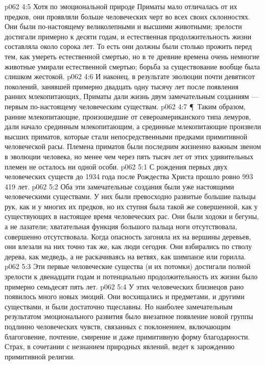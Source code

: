 \vs p062 4:5 Хотя по эмоциональной природе Приматы мало отличалась от их предков, они проявляли больше человеческих черт во всех своих склонностях. Они были по\hyp{}настоящему великолепными и высшими животными; зрелости достигали примерно к десяти годам, и естественная продолжительность жизни составляла около сорока лет. То есть они должны были столько прожить перед тем, как умереть естественной смертью, но в те древние времена очень немногие животные умирали естественной смертью; борьба за существование вообще была слишком жестокой.
\vs p062 4:6 И наконец, в результате эволюции почти девятисот поколений, занявшей примерно двадцать одну тысячу лет после появления ранних млекопитающих, Приматы  дали жизнь двум замечательным созданиям --- первым по\hyp{}настоящему человеческим существам.
\vs p062 4:7 \P\ Таким образом, ранние млекопитающие, произошедшие от североамериканского типа лемуров, дали начало срединным млекопитающим, а срединные млекопитающие произвели высших приматов, которые стали непосредственными предками примитивной человеческой расы. Племена приматов были последним жизненно важным звеном в эволюции человека, но менее чем через пять тысяч лет от этих удивительных племен не осталось ни одной особи.
\vs p062 5:1 С рождения первых двух человеческих существ до 1934 года после Рождества Христа прошло ровно 993\,419 лет.
\vs p062 5:2 Оба эти замечательные создания были уже настоящими человеческими существами. У них были превосходно развитые большие пальцы рук, как и у многих их предков, но их ступня была такой же совершенной, как у существующих в настоящее время человеческих рас. Они были ходоки и бегуны, а не лазатели; хватательная функция большого пальца ноги отсутствовала, совершенно отсутствовала. Когда опасность загоняла их на вершины деревьев, они влезали на них точно так же, как люди сегодня. Они взбирались по стволу дерева, как медведь, а не раскачиваясь на ветвях, как шимпанзе или горилла.
\vs p062 5:3 Эти первые человеческие существа (и их потомки) достигали полной зрелости к двенадцати годам и потенциально продолжительность их жизни было примерно семьдесят пять лет.
\vs p062 5:4 У этих человеческих близнецов рано появилось много новых эмоций. Они восхищались и предметами, и другими существами, и были достаточно тщеславны. Но наиболее замечательным результатом эмоционального развития было внезапное появление новой группы подлинно человеческих чувств, связанных с поклонением, включающим благоговение, почтение, смирение и даже примитивную форму благодарности. Страх, в сочетании с незнанием природных явлений, ведет к зарождению примитивной религии.

